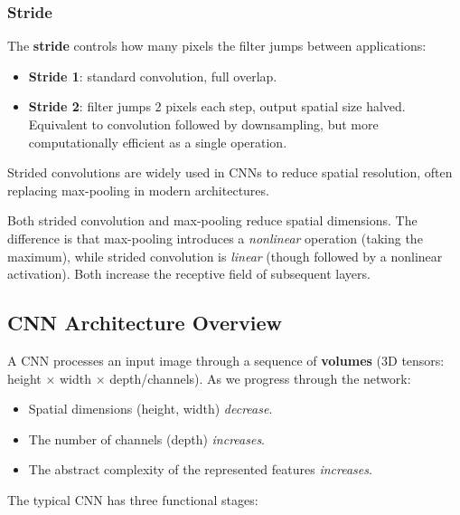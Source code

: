 \documentclass[11pt,a4paper]{article}
\newcommand{\term}[1]{\textcolor{DefGreen}{\textbf{#1}}}
\begin{document}
\subsubsection{Stride}

The \term{stride} controls how many pixels the filter jumps between applications:
\begin{itemize}
  \item \textbf{Stride 1}: standard convolution, full overlap.
  \item \textbf{Stride 2}: filter jumps 2 pixels each step, output spatial size halved. Equivalent to convolution followed by downsampling, but more computationally efficient as a single operation.
\end{itemize}
Strided convolutions are widely used in CNNs to reduce spatial resolution, often replacing max-pooling in modern architectures.

\begin{warnbox}
Both strided convolution and max-pooling reduce spatial dimensions. The difference is that max-pooling introduces a \emph{nonlinear} operation (taking the maximum), while strided convolution is \emph{linear} (though followed by a nonlinear activation). Both increase the receptive field of subsequent layers.
\end{warnbox}

\subsection{CNN Architecture Overview}

A CNN processes an input image through a sequence of \term{volumes} (3D tensors: height $\times$ width $\times$ depth/channels). As we progress through the network:
\begin{itemize}
  \item Spatial dimensions (height, width) \emph{decrease}.
  \item The number of channels (depth) \emph{increases}.
  \item The abstract complexity of the represented features \emph{increases}.
\end{itemize}

The typical CNN has three functional stages:
\end{document}
